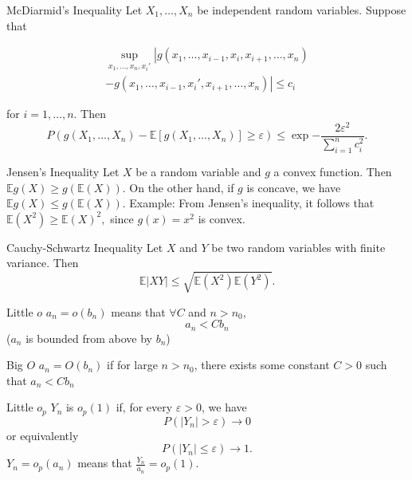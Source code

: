 \documentclass[avery5371,grid]{flashcards}
\begin{document}
\begin{flashcard}[Theorem]{McDiarmid's Inequality}
\scriptsize
Let $X_1,\ldots,X_n$ be independent random variables. Suppose that

\begin{multline}
 \sup_{x_1,\ldots,x_n,x_i'}\left| g(x_1,\ldots,x_{i-1},x_i,x_{i+1},\ldots,x_n)\right.
  \\ \left. -  g(x_1,\ldots,x_{i-1},x_i',x_{i+1},\ldots,x_n) \right| \le c_i 
\end{multline}

for $i = 1, \ldots, n$.
Then 
\[
P\left( g\left( X_1, \ldots, X_n\right) - \mathbb{E}\left[ g\left( X_1, \ldots, X_n\right) \right] \ge \varepsilon \right) \le \exp{-\frac{2\varepsilon^2}{\sum_{i=1}^n c_i^2}}.
\]
\end{flashcard}

\begin{flashcard}[Theorem]{Jensen's Inequality}
Let $X$ be a random variable and $g$ a convex function. Then $\mathbb{E}g(X) \ge g\left( \mathbb{E}(X) \right)$.
On the other hand, if $g$ is concave, we have $\mathbb{E}g(X) \le g\left( \mathbb{E}(X) \right)$.
Example:
From Jensen's inequality, it follows that 
$\mathbb{E}(X^2) \ge \mathbb E(X)^2,
$
since $g(x)=x^2$ is convex. 
\end{flashcard}

\begin{flashcard}[Theorem]{Cauchy-Schwartz Inequality}
Let $X$ and $Y$ be two random variables with finite variance. Then 
\[
\mathbb{E}\left|XY\right| \le \sqrt{\mathbb E (X^2) \mathbb{E}(Y^2)}.
\]
\end{flashcard}

\begin{flashcard}[Definition]{Little $o$}
$a_n = o(b_n)$ means that $\forall C$ and $n > n_0$, 
\[a_n < C b_n\] ($a_n$ is bounded from above by $b_n$)
\end{flashcard}

\begin{flashcard}[Definition]{Big $O$}
 $a_n = O(b_n)$ if for large $n > n_0$, there exists some constant $C>0$ such that $a_n < C b_n$ 
\end{flashcard}


\begin{flashcard}[Definition]{Little $o_p$}
$Y_n$ is $o_p(1)$ if, for every $\varepsilon > 0$, we have
\[
P\left( |Y_n| > \varepsilon \right) \to  0
\]
or equivalently
\[
P\left( |Y_n| \le \varepsilon \right) \to 1.
\]
$Y_n = o_p(a_n)$ means that $\frac{Y_n}{a_n} = o_p(1)$.
\end{flashcard}
\end{document}
